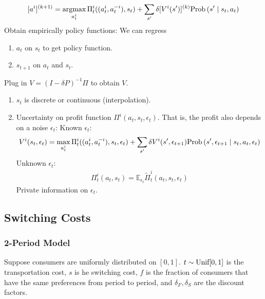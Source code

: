 \documentclass[11pt]{elegantbook}
\newcommand{\argmax}{\operatornamewithlimits{argmax}}
\begin{document}
\begin{enumerate}
    \begin{equation}
        \begin{aligned}
            [a^i]^{(k+1)}=\argmax_{a^i_t}\Pi_t^i((a^i_t,a^{-i}_t),s_t)+\sum_{s'}\delta [V^i(s')]^{(k)}\textnormal{Prob}\left(s'\mid s_t,a_t\right)
        \end{aligned}
        \nonumber
    \end{equation}
    Obtain empirically policy functions:
    We can regress
    \begin{enumerate}
        \item $a_t$ on $s_t$ to get policy function.
        \item $s_{t+1}$ on $a_t$ and $s_t$.
    \end{enumerate}
    Plug in $V=(I-\delta P)^{-1}\Pi$ to obtain $V$.
\end{enumerate}

\begin{enumerate}
    \item $s_t$ is discrete or continuous (interpolation).
    \item Uncertainty on profit function $\Pi^i(a_t,s_t,\epsilon_t)$. That is, the profit also depends on a noise $\epsilon_t$:
    \subitem Known $\epsilon_t$:
    \begin{equation}
        \begin{aligned}
            V^i(s_t,\epsilon_t)=\max_{a^i_t}\Pi_t^i((a^i_t,a^{-i}_t),s_t,\epsilon_t)+\sum_{s'}\delta V^i(s',\epsilon_{t+1})\textnormal{Prob}\left(s',\epsilon_{t+1}\mid s_t,a_t,\epsilon_t\right)
        \end{aligned}
        \nonumber
    \end{equation}
    \subitem Unknown $\epsilon_t$:
    \begin{equation}
        \begin{aligned}
            \Pi_t^i(a_t,s_t)=\mathbb{E}_{\epsilon_t}\tilde{\Pi}_t^i(a_t,s_t,\epsilon_t)
        \end{aligned}
        \nonumber
    \end{equation}
    \subitem Private information on $\epsilon_t$.
\end{enumerate}

\subsection{Switching Costs}
\subsubsection*{2-Period Model}
Suppose consumers are uniformly distributed on $[0,1]$. $t\sim \textnormal{Unif}[0,1]$ is the transportation cost, $s$ is he switching cost, $f$ is the fraction of consumers that have the same preferences from period to period, and $\delta_F,\delta_S$ are the discount factors.
\end{document}
